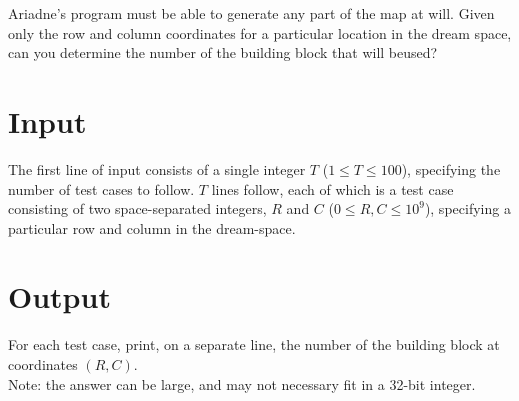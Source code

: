 Ariadne's program must be able to generate any part of the map at will. Given only the row and column coordinates for a particular location in the dream space, can you determine the number of the building block that will beused?

\section*{Input}
The first line of input consists of a single integer $T$ ($1 \leq T \leq 100$), specifying the number of test cases to follow.
$T$ lines follow, each of which is a test case consisting of two space-separated integers, $R$ and $C$ ($0 \leq R, C \leq 10^{9}$), specifying a particular row and column in the dream-space.\\

\section*{Output}
For each test case, print, on a separate line, the number of the building block at coordinates $(R, C)$.\\
Note: the answer can be large, and may not necessary fit in a 32-bit integer.\\
